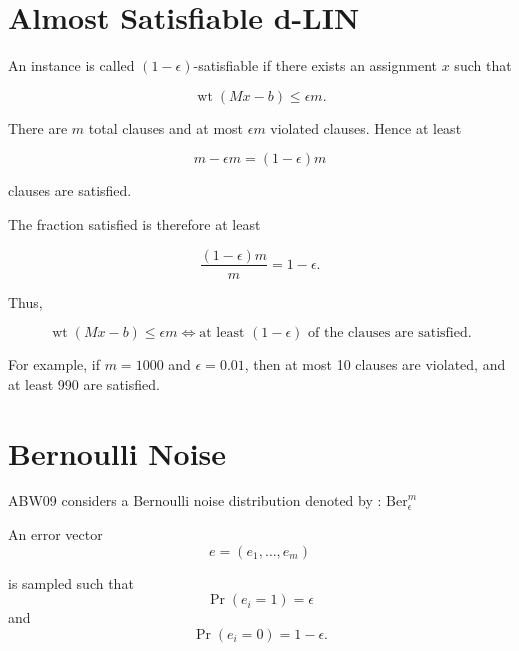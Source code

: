 \documentclass[11pt,a4paper]{article}
\newcommand{\wt}{\operatorname{wt}}
\newcommand{\Ber}{\mathrm{Ber}}
\newcommand{\Prob}{\Pr}
\begin{document}
\section{Almost Satisfiable d-LIN}

An instance is called $(1-\epsilon)$-satisfiable if there exists an
assignment $x$ such that

\begin{equation}
    \wt(Mx-b)\leq \epsilon m.
    \label{eq:satisfiable}
\end{equation}

There are $m$ total clauses and at most $\epsilon m$ violated clauses.
Hence at least

\begin{equation}
    m-\epsilon m
    =
    (1-\epsilon)m
\end{equation}

clauses are satisfied.

The fraction satisfied is therefore at least

\begin{equation}
    \frac{(1-\epsilon)m}{m}
    =
    1-\epsilon.
\end{equation}

Thus,

\begin{equation}
    \boxed{
    \wt(Mx-b)\leq\epsilon m
    \iff
    \text{at least }(1-\epsilon)\text{ of the clauses are satisfied}.
    }
\end{equation}

For example, if $m=1000$ and $\epsilon=0.01$, then at most 10
clauses are violated, and at least 990 are satisfied.

\section{Bernoulli Noise}

ABW09 considers a Bernoulli noise distribution denoted by : 
    $\Ber_\epsilon^m$

An error vector \begin{equation}
    e=(e_1,\ldots,e_m)
\end{equation}

is sampled such that \begin{equation}
    \Prob(e_i=1)=\epsilon
\end{equation}
and
\begin{equation}
    \Prob(e_i=0)=1-\epsilon.
\end{equation}
\end{document}
